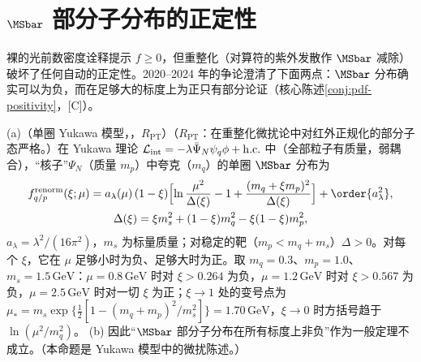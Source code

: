 \section{$\MSbar$ 部分子分布的正定性}\label{sec:front-positivity}

裸的光前数密度诠释提示 $f\ge0$，但重整化（对算符的紫外发散作 $\MSbar$ 减除）破坏了任何自动的正定性。2020--2024 年的争论澄清了下面两点：$\MSbar$ 分布确实可以为负，而在足够大的标度上为正只有部分论证（核心陈述\cref{conj:pdf-positivity}，[C]）。

\begin{proposition}\label{prop:front-msbar-negative}
(a)（单圈 Yukawa 模型，\tagR，$R_{\mathrm{PT}}$）（$R_{\mathrm{PT}}$：在重整化微扰论中对红外正规化的部分子态严格。）在 Yukawa 理论 $\mathcal L_{\rm int}=-\lambda\bar\Psi_N\psi_q\phi+{\rm h.c.}$ 中（全部粒子有质量，弱耦合），“核子”$\Psi_N$（质量 $m_p$）中夸克（$m_q$）的单圈 $\MSbar$ 分布为
\begin{equation}\label{eq:front-yukawa}
\begin{gathered}
f^{\rm renorm}_{q/p}(\xi;\mu)=a_\lambda(\mu)\,(1-\xi)\Bigl[\ln\frac{\mu^2}{\Delta(\xi)}-1+\frac{(m_q+\xi m_p)^2}{\Delta(\xi)}\Bigr]+\order{a_\lambda^2},\\
\Delta(\xi)=\xi m_s^2+(1-\xi)m_q^2-\xi(1-\xi)m_p^2,
\end{gathered}
\end{equation}
$a_\lambda=\lambda^2/(16\pi^2)$，$m_s$ 为标量质量；对稳定的靶（$m_p<m_q+m_s$）$\Delta>0$。对每个 $\xi$，它在 $\mu$ 足够小时为负、足够大时为正。取 $m_q=0.3$、$m_p=1.0$、$m_s=1.5\,\mathrm{GeV}$：$\mu=0.8\,\mathrm{GeV}$ 时对 $\xi>0.264$ 为负，$\mu=1.2\,\mathrm{GeV}$ 时对 $\xi>0.567$ 为负，$\mu=2.5\,\mathrm{GeV}$ 时对一切 $\xi$ 为正；$\xi\to1$ 处的变号点为 $\mu_*=m_s\exp\{\frac12[1-(m_q+m_p)^2/m_s^2]\}=1.70\,\mathrm{GeV}$，$\xi\to0$ 时方括号趋于 $\ln(\mu^2/m_q^2)$。
(b) 因此“$\MSbar$ 部分子分布在所有标度上非负”作为一般定理不成立。（本命题是 Yukawa 模型中的微扰陈述。）
\end{proposition}

